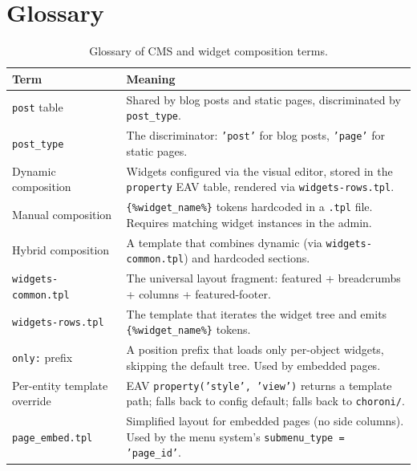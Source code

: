 \documentclass[11pt,a4paper]{article}
\begin{document}
\section{Glossary}\label{app:glossary}
\begin{table}[htbp]
\centering
\caption{Glossary of CMS and widget composition terms.}\label{tab:glossary-v8}
\footnotesize\sloppy
\begin{tabularx}{\columnwidth}{>{\raggedright\arraybackslash}p{3.5cm}X}
\toprule
\textbf{Term} & \textbf{Meaning} \\
\midrule
\texttt{post} table & Shared by blog posts and static pages, discriminated by \texttt{post\_type}. \\
\texttt{post\_type} & The discriminator: \texttt{'post'} for blog posts, \texttt{'page'} for static pages. \\
Dynamic composition & Widgets configured via the visual editor, stored in the \texttt{property} EAV table, rendered via \texttt{widgets-rows.tpl}. \\
Manual composition & \texttt{\{\%widget\_name\%\}} tokens hardcoded in a \texttt{.tpl} file. Requires matching widget instances in the admin. \\
Hybrid composition & A template that combines dynamic (via \texttt{widgets-common.tpl}) and hardcoded sections. \\
\texttt{widgets-common.tpl} & The universal layout fragment: featured + breadcrumbs + columns + featured-footer. \\
\texttt{widgets-rows.tpl} & The template that iterates the widget tree and emits \texttt{\{\%widget\_name\%\}} tokens. \\
\texttt{only:} prefix & A position prefix that loads only per-object widgets, skipping the default tree. Used by embedded pages. \\
Per-entity template override & EAV \texttt{property('style', 'view')} returns a template path; falls back to config default; falls back to \texttt{choroni/}. \\
\texttt{page\_embed.tpl} & Simplified layout for embedded pages (no side columns). Used by the menu system's \texttt{submenu\_type = 'page\_id'}. \\
\bottomrule
\end{tabularx}
\end{table}
\end{document}
